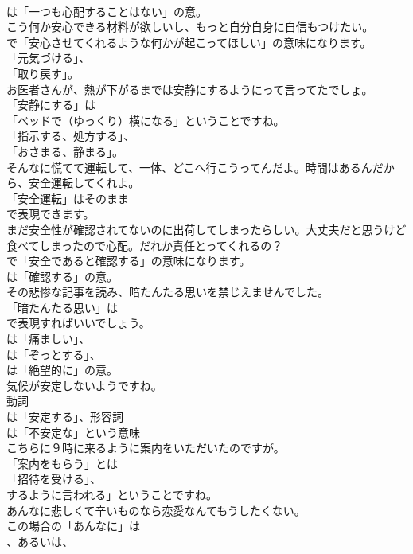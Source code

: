 \documentclass[8pt]{extreport}
\begin{document}
\begin{CJK}{UTF8}{min}
\\	は「一つも心配することはない」の意。	
\\	こう何か安心できる材料が欲しいし、もっと自分自身に自信もつけたい。 
\\	で「安心させてくれるような何かが起こってほしい」の意味になります。
\\	「元気づける」、
\\	「取り戻す」。	
\\	お医者さんが、熱が下がるまでは安静にするようにって言ってたでしょ。 
\\	「安静にする」は
\\	「ベッドで（ゆっくり）横になる」ということですね。
\\	「指示する、処方する」、
\\	「おさまる、静まる」。	
\\	そんなに慌てて運転して、一体、どこへ行こうってんだよ。時間はあるんだから、安全運転してくれよ。 
\\	「安全運転」はそのまま
\\	で表現できます。	
\\	まだ安全性が確認されてないのに出荷してしまったらしい。大丈夫だと思うけど食べてしまったので心配。だれか責任とってくれるの？ 
\\	で「安全であると確認する」の意味になります。
\\	は「確認する」の意。	
\\	その悲惨な記事を読み、暗たんたる思いを禁じえませんでした。 
\\	「暗たんたる思い」は 
\\	で表現すればいいでしょう。
\\	は「痛ましい」、
\\	は「ぞっとする」、
\\	は「絶望的に」の意。	
\\	気候が安定しないようですね。 
\\	動詞
\\	は「安定する」、形容詞
\\	は「不安定な」という意味	
\\	こちらに９時に来るように案内をいただいたのですが。 
\\	「案内をもらう」とは
\\	「招待を受ける」、
\\	するように言われる」ということですね。	
\\	あんなに悲しくて辛いものなら恋愛なんてもうしたくない。 
\\	この場合の「あんなに」は
\\	、あるいは、

\end{CJK}
\end{document}
